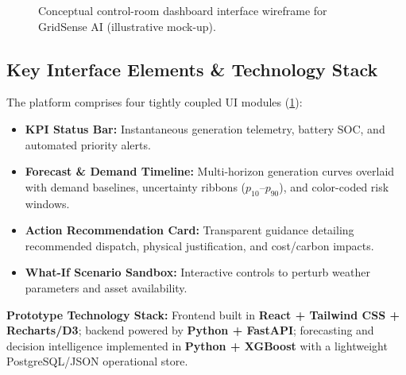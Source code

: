 \begin{figure}[htbp]
    \caption{Conceptual control-room dashboard interface wireframe for GridSense AI (illustrative mock-up).}
    \label{fig:conceptual_dashboard}
\end{figure}

\subsection{Key Interface Elements \& Technology Stack}
\label{subsec:interface_elements}

The platform comprises four tightly coupled UI modules (\cref{fig:conceptual_dashboard}):
\begin{itemize}[leftmargin=1.5em, itemsep=0.2em]
    \item \textbf{KPI Status Bar:} Instantaneous generation telemetry, battery SOC, and automated priority alerts.
    \item \textbf{Forecast \& Demand Timeline:} Multi-horizon generation curves overlaid with demand baselines, uncertainty ribbons ($p_{10}$--$p_{90}$), and color-coded risk windows.
    \item \textbf{Action Recommendation Card:} Transparent guidance detailing recommended dispatch, physical justification, and cost/carbon impacts.
    \item \textbf{What-If Scenario Sandbox:} Interactive controls to perturb weather parameters and asset availability.
\end{itemize}

\textbf{Prototype Technology Stack:} Frontend built in \textbf{React + Tailwind CSS + Recharts/\-D3}; backend powered by \textbf{Python + FastAPI}; forecasting and decision intelligence implemented in \textbf{Python + XGBoost} with a lightweight PostgreSQL/JSON operational store.

